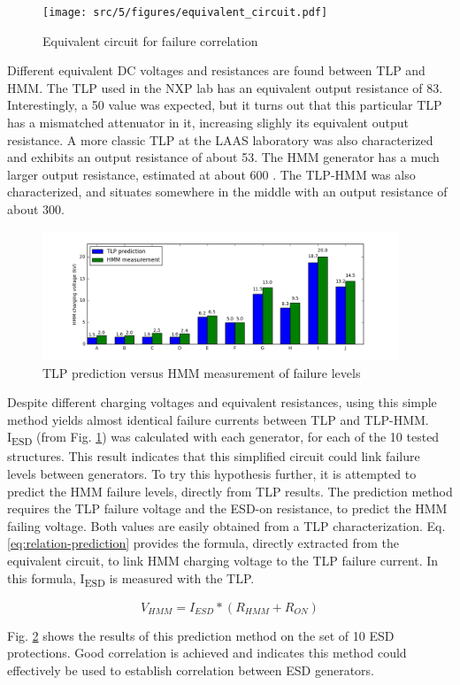 \begin{figure}[!h]
  \centering
  \texttt{[image: src/5/figures/equivalent\_circuit.pdf]}
  \caption{Equivalent circuit for failure correlation}
  \label{fig:simple_equivalent_circuit}
\end{figure}

Different equivalent DC voltages and resistances are found between TLP and HMM.
The TLP used in the NXP lab has an equivalent output resistance of 83\textOmega{}.
Interestingly, a 50\textOmega{} value was expected, but it turns out that this particular TLP has a mismatched attenuator in it, increasing slighly its equivalent output resistance.
A more classic TLP at the LAAS laboratory was also characterized and exhibits an output resistance of about 53\textOmega{}.
The HMM generator has a much larger output resistance, estimated at about 600 \textOmega{}.
The TLP-HMM was also characterized, and situates somewhere in the middle with an output resistance of about 300\textOmega{}.

\begin{figure}[!h]
  \centering
  \includegraphics[width=0.95\textwidth]{src/5/figures/correlation_results.png}
  \caption{TLP prediction versus HMM measurement of failure levels}
  \label{fig:predicted_vs_measured_levels}
\end{figure}

Despite different charging voltages and equivalent resistances, using this simple method yields almost identical failure currents between TLP and TLP-HMM.
I\textsubscript{ESD} (from Fig. \ref{fig:simple_equivalent_circuit}) was calculated with each generator, for each of the 10 tested structures.
This result indicates that this simplified circuit could link failure levels between generators.
To try this hypothesis further, it is attempted to predict the HMM failure levels, directly from TLP results.
The prediction method requires the TLP failure voltage and the ESD-on resistance, to predict the HMM failing voltage.
Both values are easily obtained from a TLP characterization.
Eq. \ref{eq:relation-prediction} provides the formula, directly extracted from the equivalent circuit, to link HMM charging voltage to the TLP failure current.
In this formula, I\textsubscript{ESD} is measured with the TLP.

\begin{equation}
V_{HMM} = I_{ESD} * (R_{HMM} + R_{ON})
\label{eq:relation-prediction}
\end{equation}

Fig. \ref{fig:predicted_vs_measured_levels} shows the results of this prediction method on the set of 10 ESD protections.
Good correlation is achieved and indicates this method could effectively be used to establish correlation between ESD generators.
